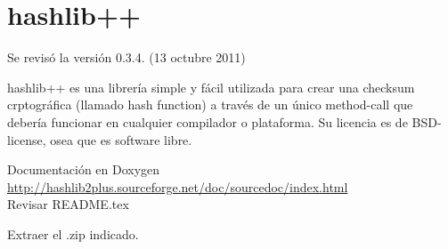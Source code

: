\documentclass[spanish]{article}
\begin{document}
\section{hashlib++}

Se revisó la versión 0.3.4. (13 octubre 2011)

hashlib++ es una librería simple y fácil utilizada para crear una checksum crptográfica (llamado hash function) a través de un único method-call que debería funcionar en cualquier compilador o plataforma. Su licencia es de BSD-license, osea que es software libre.

Documentación en Doxygen\\
\url{http://hashlib2plus.sourceforge.net/doc/sourcedoc/index.html}\\
Revisar README.tex

Extraer el .zip indicado.
\end{document}
